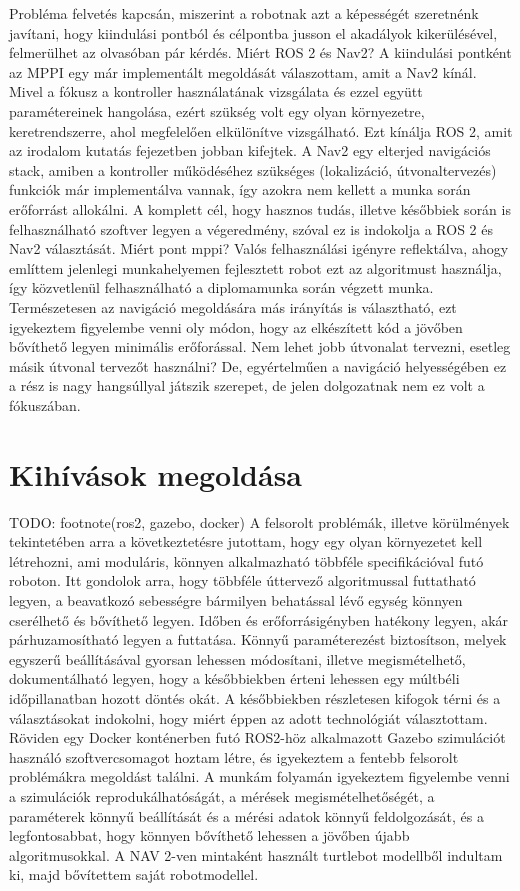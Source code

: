 Probléma felvetés  kapcsán, miszerint a robotnak azt a képességét szeretnénk javítani, hogy kiindulási pontból és célpontba jusson el akadályok kikerülésével, felmerülhet az olvasóban pár kérdés. Miért ROS 2 és Nav2? A kiindulási pontként az MPPI egy már implementált megoldását válaszottam, amit a Nav2 kínál. Mivel a fókusz a kontroller használatának vizsgálata és ezzel együtt paramétereinek hangolása, ezért szükség volt egy olyan környezetre, keretrendszerre, ahol megfelelően elkülönítve vizsgálható. Ezt kínálja  ROS 2, amit az irodalom kutatás fejezetben jobban kifejtek. A Nav2 egy elterjed navigációs stack, amiben a kontroller működéséhez szükséges (lokalizáció, útvonaltervezés) funkciók már implementálva vannak, így azokra nem kellett a munka során erőforrást allokálni. A komplett cél, hogy hasznos tudás, illetve későbbiek során is felhasználható szoftver legyen a végeredmény, szóval ez is indokolja a ROS 2 és Nav2 választását.
Miért pont mppi? Valós felhasználási igényre reflektálva, ahogy említtem jelenlegi munkahelyemen fejlesztett robot ezt az algoritmust használja, így közvetlenül felhasználható a diplomamunka során végzett munka. Természetesen az navigáció megoldására más irányítás is választható, ezt igyekeztem figyelembe venni oly módon, hogy az elkészített kód a jövőben bővíthető legyen minimális erőforással. Nem lehet jobb útvonalat tervezni, esetleg másik útvonal tervezőt használni? De, egyértelműen a navigáció helyességében ez a rész is nagy hangsúllyal játszik szerepet, de jelen dolgozatnak nem ez volt a fókuszában.

\section{Kihívások megoldása}
TODO: footnote(ros2, gazebo, docker)
A felsorolt problémák, illetve körülmények tekintetében arra a következtetésre jutottam, hogy egy olyan környezetet kell létrehozni, ami moduláris, könnyen alkalmazható többféle specifikációval futó roboton. Itt gondolok arra, hogy többféle úttervező algoritmussal futtatható legyen, a beavatkozó sebességre bármilyen behatással lévő egység könnyen cserélhető és bővíthető legyen. Időben és erőforrásigényben hatékony legyen, akár párhuzamosítható legyen a futtatása. Könnyű paraméterezést biztosítson, melyek egyszerű beállításával gyorsan lehessen módosítani, illetve megismételhető, dokumentálható legyen, hogy a későbbiekben érteni lehessen egy múltbéli időpillanatban hozott döntés okát. A későbbiekben részletesen kifogok térni és a választásokat indokolni, hogy miért éppen az adott technológiát választottam. Röviden egy Docker konténerben futó ROS2-höz alkalmazott Gazebo szimulációt használó szoftvercsomagot hoztam létre, és igyekeztem a fentebb felsorolt problémákra megoldást találni. A munkám folyamán igyekeztem figyelembe venni a szimulációk reprodukálhatóságát, a mérések megismételhetőségét, a paraméterek könnyű beállítását és a mérési adatok könnyű feldolgozását, és a legfontosabbat, hogy könnyen bővíthető lehessen a jövőben újabb algoritmusokkal. A NAV 2-ven mintaként használt turtlebot modellből indultam ki, majd bővítettem saját robotmodellel.


